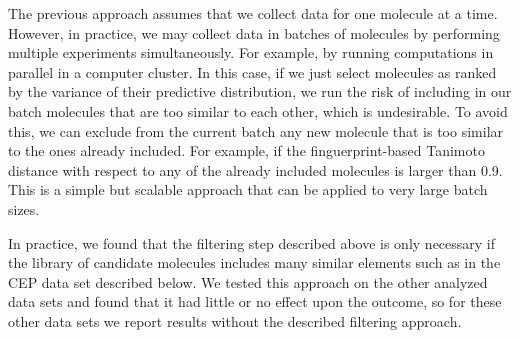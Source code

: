 The previous approach assumes that we collect data for one molecule at a time. However, in practice, we may
collect data in batches of molecules by performing multiple experiments simultaneously. For example, by running computations in parallel in a computer cluster. In this case, if we just select molecules as ranked by the variance of their predictive distribution, we run the risk of including in our batch molecules that are too similar to each other, which is undesirable. To avoid this, we can exclude from the current batch any new molecule that is too similar to the ones already included. For example, if the finguerprint-based Tanimoto distance with respect to any of the already included molecules is larger than 0.9. This is a simple but scalable approach that can be applied to very large batch sizes. 

In practice, we found that the filtering step described above is only necessary if the library of candidate molecules includes many similar elements such as in the CEP data set described below. We tested this approach on the other analyzed data sets and found that it had little or no effect upon the outcome, so for these other data sets we report results without the described filtering approach.